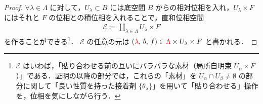\documentclass[algtopo_main]{subfiles}
\begin{document}
\begin{proof}
    

	$\forall \lambda \in \Lambda$ に対して，$U_\lambda \subset B$ には底空間 $B$ からの相対位相を入れ，$U_\lambda \times F$ にはそれと $F$ の位相との積位相を入れることで，直和位相空間
	\begin{align}
	\mathcal{E} \coloneqq \coprod_{\lambda \in \Lambda} U_\lambda \times F
	\end{align}
	を作ることができる\footnote{$\mathcal{E}$ はいわば，「貼り合わせる前の互いにバラバラな素材（局所自明束 $U_\alpha \times F$）」である．証明の以降の部分では，これらの「素材」を $U_\alpha \cap U_\beta \neq \emptyset$ の部分に関して「良い性質を持った接着剤 $\{ \theta_{\lambda} \}$」を用いて「貼り合わせる」操作を，位相を気にしながら行う．}．
	$\mathcal{E}$ の任意の元は $(\textcolor{red}{\lambda},\, b,\, f) \in  \textcolor{red}{\Lambda} \times  U_\lambda \times F$ と書かれる．


\end{proof}
\end{document}
